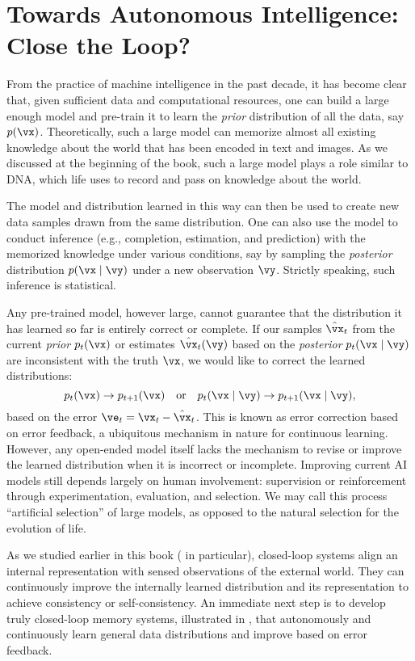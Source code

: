 \documentclass[../../book-main.tex]{subfiles}
\begin{document}
\section{Towards Autonomous Intelligence: Close the Loop?}
From the practice of machine intelligence in the past decade, it has become clear that, given sufficient data and computational resources, one can build a large enough model and pre-train it to learn the \textit{prior} distribution of all the data, say \(p(\vx)\). Theoretically, such a large model can memorize almost all existing knowledge about the world that has been encoded in text and images. As we discussed at the beginning of the book, such a large model plays a role similar to DNA, which life uses to record and pass on knowledge about the world.

The model and distribution learned in this way can then be used to create new data samples drawn from the same distribution. One can also use the model to conduct inference (e.g., completion, estimation, and prediction) with the memorized knowledge under various conditions, say by sampling the \textit{posterior} distribution \(p(\vx\mid \vy)\) under a new observation \(\vy\). Strictly speaking, such inference is statistical.

Any pre-trained model, however large, cannot guarantee that the distribution it has learned so far is entirely correct or complete. If our samples \(\hat{\vx}_{t}\) from the current \textit{prior} \(p_{t}(\vx)\) or estimates \(\hat{\vx}_{t}(\vy)\) based on the \textit{posterior} \(p_{t}(\vx\mid \vy)\) are inconsistent with the truth \(\vx\), we would like to correct the learned distributions:
\begin{equation}
    p_{t}(\vx) \rightarrow p_{t+1}(\vx) \quad \text{or}\quad p_{t}(\vx\mid \vy) \rightarrow p_{t+1}(\vx\mid \vy),
\end{equation}
based on the error \(\ve_{t} = \vx_{t} - \hat{\vx}_{t}\). This is known as error correction based on error feedback, a ubiquitous mechanism in nature for continuous learning. However, any open-ended model itself lacks the mechanism to revise or improve the learned distribution when it is incorrect or incomplete. Improving current AI models still depends largely on human involvement: supervision or reinforcement through experimentation, evaluation, and selection. We may call this process ``artificial selection'' of large models, as opposed to the natural selection for the evolution of life.

As we studied earlier in this book ( in particular), closed-loop systems align an internal representation with sensed observations of the external world. They can continuously improve the internally learned distribution and its representation to achieve consistency or self-consistency. An immediate next step is to develop truly closed-loop memory systems, illustrated in , that autonomously and continuously learn general data distributions and improve based on error feedback.
\end{document}
